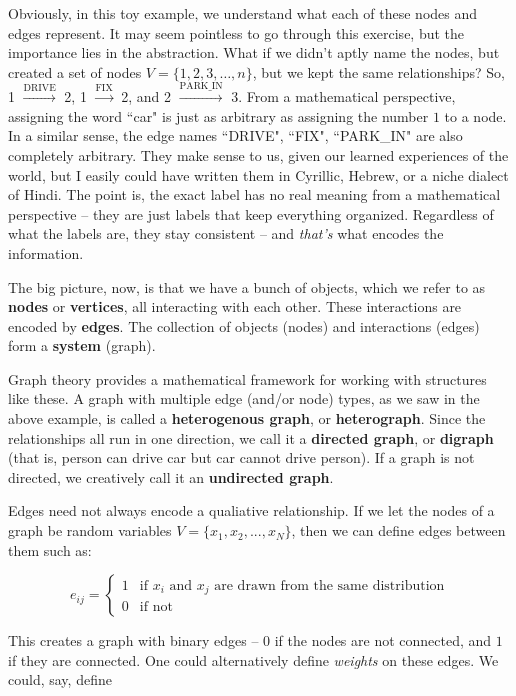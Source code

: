 \documentclass{article}
\theoremstyle{definition}
\begin{document}
Obviously, in this toy example, we understand what each of these nodes and edges represent. It may seem pointless to go through this exercise, but the importance lies in the abstraction. What if we didn't aptly name the nodes, but created a set of nodes $V = \{1, 2, 3, \dots, n\}$, but we kept the same relationships? So, 1 $\xrightarrow{\text{DRIVE}}$ 2, 1 $\xrightarrow{\text{FIX}}$ 2, and 2 $\xrightarrow{\text{PARK\_IN}}$ 3. From a mathematical perspective, assigning the word ``car" is just as arbitrary as assigning the number $1$ to a node. In a similar sense, the edge names ``DRIVE", ``FIX", ``PARK\_IN" are also completely arbitrary. They make sense to us, given our learned experiences of the world, but I easily could have written them in Cyrillic, Hebrew, or a niche dialect of Hindi. The point is, the exact label has no real meaning from a mathematical perspective -- they are just labels that keep everything organized. Regardless of what the labels are, they stay consistent -- and \textit{that's} what encodes the information.

The big picture, now, is that we have a bunch of objects, which we refer to as \textbf{nodes} or \textbf{vertices}, all interacting with each other. These interactions are encoded by \textbf{edges}. The collection of objects (nodes) and interactions (edges) form a \textbf{system} (graph). 

Graph theory provides a mathematical framework for working with structures like these. A graph with multiple edge (and/or node) types, as we saw in the above example, is called a \textbf{heterogenous graph}, or \textbf{heterograph}. Since the relationships all run in one direction, we call it a \textbf{directed graph}, or \textbf{digraph} (that is, person can drive car but car cannot drive person). If a graph is not directed, we creatively call it an \textbf{undirected graph}.

Edges need not always encode a qualiative relationship. If we let the nodes of a graph be random variables $V = \{x_1, x_2, ..., x_N\}$, then we can define edges between them such as:

\[
e_{ij} = \begin{cases}
1 & \text{if }x_i \text{ and } x_j \text{ are drawn from the same distribution} \\ 
0 & \text{if not}
\end{cases}
\]

This creates a graph with binary edges -- $0$ if the nodes are not connected, and $1$ if they are connected. One could alternatively define \textit{weights} on these edges. We could, say, define
\end{document}

